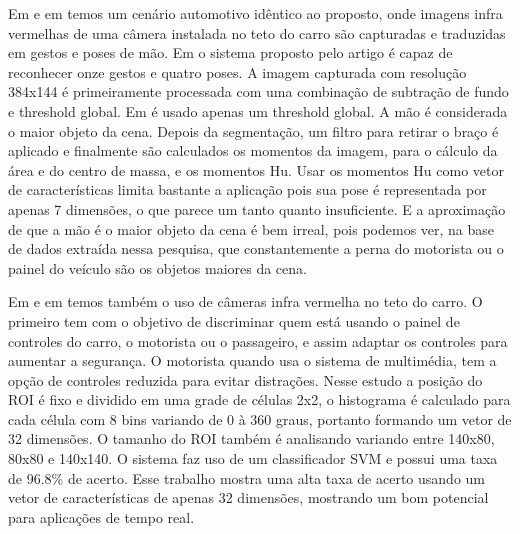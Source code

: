
Em \cite{zobl2004gesture} e em \cite{akyol2000gesture} temos um cenário automotivo idêntico ao proposto, onde imagens infra vermelhas de uma câmera instalada no teto do carro são capturadas e traduzidas em gestos e poses de mão. Em \cite{zobl2004gesture} o sistema proposto pelo artigo é capaz de reconhecer onze gestos e quatro poses. A imagem capturada com resolução 384x144 é primeiramente processada com uma combinação de subtração de fundo e threshold global. Em \cite{akyol2000gesture} é usado apenas um threshold global. A mão é considerada o maior objeto da cena. Depois da segmentação, um filtro para retirar o braço é aplicado e finalmente são calculados os momentos da imagem, para o cálculo da área e do centro de massa, e os momentos Hu. Usar os momentos Hu como vetor de características limita bastante a aplicação pois sua pose é representada por apenas 7 dimensões, o que parece um tanto quanto insuficiente. E a aproximação de que a mão é o maior objeto da cena é bem irreal, pois podemos ver, na base de dados extraída nessa pesquisa, que constantemente a perna do motorista ou o painel do veículo são os objetos maiores da cena.

Em \cite{cheng2008real} e em \cite{parada2014hand} temos também o uso de câmeras infra vermelha no teto do carro. O primeiro tem com o objetivo de discriminar quem está usando o painel de controles do carro, o motorista ou o passageiro, e assim adaptar os controles para aumentar a segurança. O motorista quando usa o sistema de multimédia, tem a opção de controles reduzida para evitar distrações. Nesse estudo a posição do ROI é fixo e dividido em uma grade de células 2x2, o histograma é calculado para cada célula com 8 bins variando de 0 à 360 graus, portanto formando um vetor de 32 dimensões. O tamanho do ROI também é analisando variando entre 140x80, 80x80 e 140x140. O sistema faz uso de um classificador SVM e possui uma taxa de 96.8\% de acerto. Esse trabalho mostra uma alta taxa de acerto usando um vetor de características de apenas 32 dimensões, mostrando um bom potencial para aplicações de tempo real.

